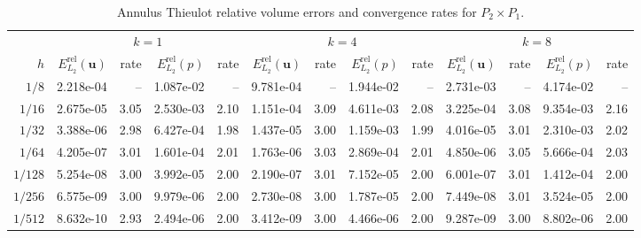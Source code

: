 \documentclass[10pt,a4paper]{article}
\begin{document}
\begin{table}[p]
\centering
\caption{Annulus Thieulot relative volume errors and convergence rates for $P_2\times P_1$.}
\label{tab:annulus_thieulot_v2_p1_cont}
\small
\begin{tabular}{
r rr rr rr rr rr rr
}
\toprule
& \multicolumn{4}{c}{$k=1$} & \multicolumn{4}{c}{$k=4$} & \multicolumn{4}{c}{$k=8$} \\
\cmidrule(lr){2-5}\cmidrule(lr){6-9}\cmidrule(lr){10-13}
$h$ & $E_{L_2}^{\mathrm{rel}}(\mathbf{u})$ & rate & $E_{L_2}^{\mathrm{rel}}(p)$ & rate & $E_{L_2}^{\mathrm{rel}}(\mathbf{u})$ & rate & $E_{L_2}^{\mathrm{rel}}(p)$ & rate & $E_{L_2}^{\mathrm{rel}}(\mathbf{u})$ & rate & $E_{L_2}^{\mathrm{rel}}(p)$ & rate \\
\midrule
$1/8$ & 2.218e-04 & -- & 1.087e-02 & -- & 9.781e-04 & -- & 1.944e-02 & -- & 2.731e-03 & -- & 4.174e-02 & -- \\
$1/16$ & 2.675e-05 & 3.05 & 2.530e-03 & 2.10 & 1.151e-04 & 3.09 & 4.611e-03 & 2.08 & 3.225e-04 & 3.08 & 9.354e-03 & 2.16 \\
$1/32$ & 3.388e-06 & 2.98 & 6.427e-04 & 1.98 & 1.437e-05 & 3.00 & 1.159e-03 & 1.99 & 4.016e-05 & 3.01 & 2.310e-03 & 2.02 \\
$1/64$ & 4.205e-07 & 3.01 & 1.601e-04 & 2.01 & 1.763e-06 & 3.03 & 2.869e-04 & 2.01 & 4.850e-06 & 3.05 & 5.666e-04 & 2.03 \\
$1/128$ & 5.254e-08 & 3.00 & 3.992e-05 & 2.00 & 2.190e-07 & 3.01 & 7.152e-05 & 2.00 & 6.001e-07 & 3.01 & 1.412e-04 & 2.00 \\
$1/256$ & 6.575e-09 & 3.00 & 9.979e-06 & 2.00 & 2.730e-08 & 3.00 & 1.787e-05 & 2.00 & 7.449e-08 & 3.01 & 3.524e-05 & 2.00 \\
$1/512$ & 8.632e-10 & 2.93 & 2.494e-06 & 2.00 & 3.412e-09 & 3.00 & 4.466e-06 & 2.00 & 9.287e-09 & 3.00 & 8.802e-06 & 2.00 \\
\bottomrule
\end{tabular}
\end{table}
\end{document}
